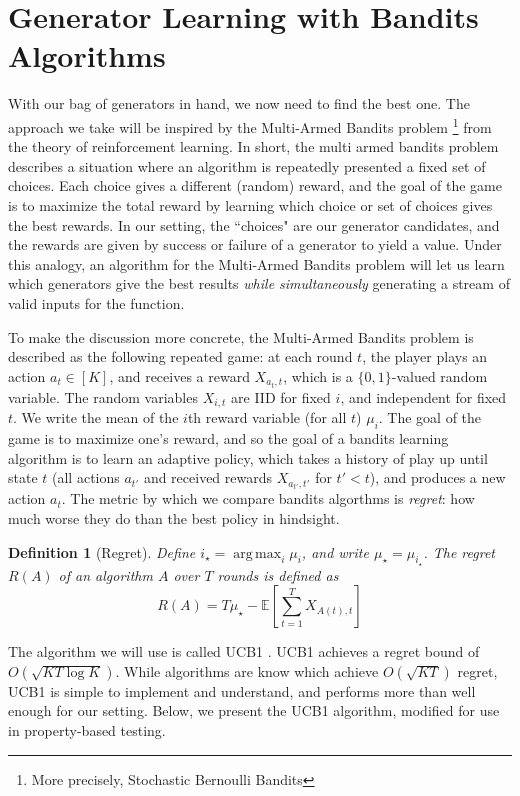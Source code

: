 \documentclass[10pt,a4paper]{article}
\newtheorem{definition}{Definition}
\DeclareMathOperator*{\argmax}{arg\,max}
\begin{document}
\section{Generator Learning with Bandits Algorithms}
\label{sec:bandits}
With our bag of generators in hand, we now need to find the best one. The approach we take will be inspired by the Multi-Armed Bandits \cite{} problem \footnote{More precisely, Stochastic Bernoulli Bandits} from the theory of reinforcement learning. In short, the multi armed bandits problem describes a situation where an algorithm is repeatedly presented a fixed set of choices. Each choice gives a different (random) reward, and the goal of the game is to maximize the total reward by learning which choice or set of choices gives the best rewards. In our setting, the ``choices" are our generator candidates, and the rewards are given by success or failure of a generator to yield a value. Under this analogy, an algorithm for the Multi-Armed Bandits problem will let us learn which generators give the best results \textit{while simultaneously} generating a stream of valid inputs for the function.

To make the discussion more concrete, the Multi-Armed Bandits problem is described as the following repeated game: at each round $t$, the player plays an action $a_t \in [K]$, and receives a reward $X_{{a_t},t}$, which is a $\{0,1\}$-valued random variable. The random variables $X_{i,t}$ are IID for fixed $i$, and independent for fixed $t$. We write the mean of the $i$th reward variable (for all $t$) $\mu_i$. The goal of the game is to maximize one's reward, and so the goal of a bandits learning algorithm is to learn an adaptive policy, which takes a history of play up until state $t$ (all actions $a_{t'}$ and received rewards $X_{a_{t'},t'}$ for $t' < t$), and produces a new action $a_t$. The metric by which we compare bandits algorthms is \textit{regret}: how much worse they do than the best policy in hindsight.

\begin{definition}[Regret]
Define $i_\star = \argmax_i \mu_i$, and write $\mu_\star = \mu_{i_\star}$. The regret $R(A)$ of an algorithm $A$ over $T$ rounds is defined as
$$
R(A) = T\mu_\star - \mathbb{E}\left[\sum_{t=1}^T X_{A(t),t}\right]
$$
\end{definition}

The algorithm we will use is called UCB1 \cite{}. UCB1 achieves a regret bound of $O(\sqrt{KT\log K})$. While algorithms are know which achieve $O(\sqrt{KT})$ regret, UCB1 is simple to implement and understand, and performs more than well enough for our setting. Below, we present the UCB1 algorithm, modified for use in property-based testing.
\end{document}
